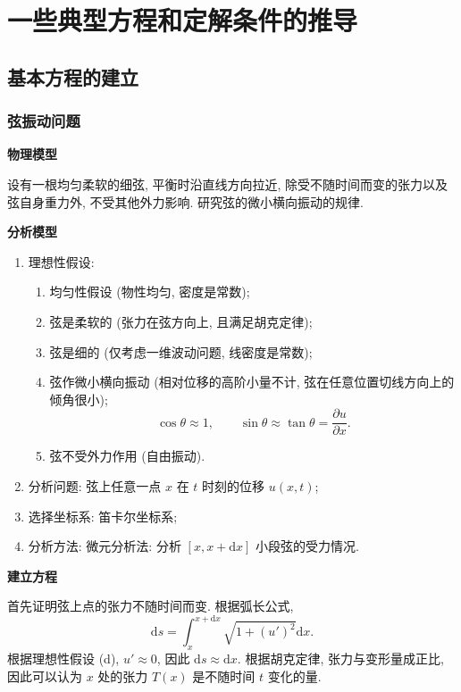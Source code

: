 \section{一些典型方程和定解条件的推导} \label{一些典型方程和定解条件的推导}
\subsection{基本方程的建立} \label{1 基本方程的建立}
\subsubsection{弦振动问题}
\textbf{物理模型}

设有一根均匀柔软的细弦, 平衡时沿直线方向拉近, 除受不随时间而变的张力以及弦自身重力外, 不受其他外力影响. 研究弦的微小横向振动的规律.

\textbf{分析模型}
\begin{enumerate}
    \item 理想性假设:
          \begin{enumerate}
              \item 均匀性假设 (物性均匀, 密度是常数);
              \item 弦是柔软的 (张力在弦方向上, 且满足胡克定律);
              \item 弦是细的 (仅考虑一维波动问题, 线密度是常数);
              \item 弦作微小横向振动 (相对位移的高阶小量不计, 弦在任意位置切线方向上的倾角很小);
                    \begin{equation*}
                        \cos\theta\approx 1,\qquad \sin\theta\approx\tan\theta=\frac{\partial u}{\partial x}.
                    \end{equation*}
              \item 弦不受外力作用 (自由振动).
          \end{enumerate}
    \item 分析问题: 弦上任意一点 $x$ 在 $t$ 时刻的位移 $u(x,t)$;
    \item 选择坐标系: 笛卡尔坐标系;
    \item 分析方法: 微元分析法: 分析 $[x,x+\mathrm{d}x]$ 小段弦的受力情况.
\end{enumerate}

\textbf{建立方程}

首先证明弦上点的张力不随时间而变. 根据弧长公式,
\begin{equation}
    \mathrm{d}s=\int_{x}^{x+\mathrm{d}x}\sqrt{1+(u')^2}\mathrm{d}x.
\end{equation}
根据理想性假设 (d), $u'\approx 0$, 因此 $\mathrm{d}s\approx\mathrm{d}x$. 根据胡克定律, 张力与变形量成正比, 因此可以认为 $x$ 处的张力 $T(x)$ 是不随时间 $t$ 变化的量.

